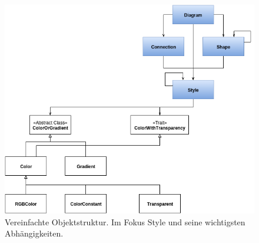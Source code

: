 \begin{figure}[H]
\begin{center}
\includegraphics[width=\textwidth]{Bilder/styleObjektstruktur.png}
\caption{Vereinfachte Objektstruktur. Im Fokus Style und seine wichtigsten Abhängigkeiten.}
\label{objectstructureStyle}
\end{center}
\end{figure}

